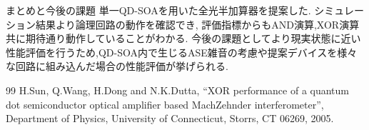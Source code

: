 \documentclass[dvipdfmx]{ujarticle}
\makeatletter
\def\section{\@startsection{section}{1}{\z@}
   {0.8\Cvs \@plus.5\Cdp \@minus.2\Cdp}
   {0.2\Cvs \@plus.3\Cdp}
   {\normalfont \Large \bfseries}}
\def\section{\@startsection{section}{1}{\z@}
   {0.8\Cvs \@plus.5\Cdp \@minus.2\Cdp}
   {0.2\Cvs \@plus.3\Cdp}
   {\normalfont \Large \bfseries}}
\makeatother
\begin{document}
\section{まとめと今後の課題}
  単一QD-SOAを用いた全光半加算器を提案した.
  シミュレーション結果より論理回路の動作を確認でき, 評価指標からもAND演算,XOR演算共に期待通り動作していることがわかる.
  今後の課題としてより現実状態に近い性能評価を行うため,QD-SOA内で生じるASE雑音の考慮や提案デバイスを様々な回路に組み込んだ場合の性能評価が挙げられる.

\begin{thebibliography} {99}
   H.Sun, Q.Wang, H.Dong and N.K.Dutta, “XOR performance of a quantum dot semiconductor optical amplifier based MachZehnder interferometer”, Department of Physics, University of Connecticut, Storrs, CT 06269, 2005.
\end{thebibliography}
\end{document}
